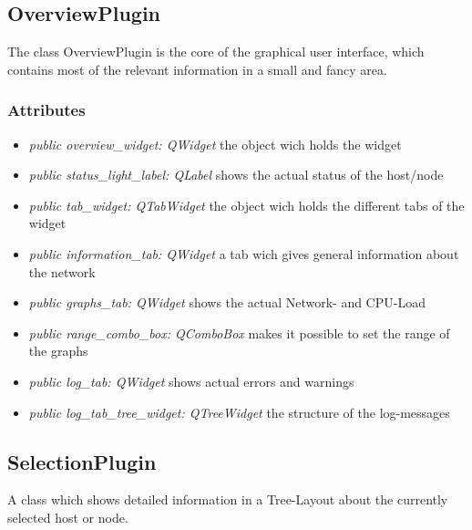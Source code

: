 \subsection{OverviewPlugin}
The class OverviewPlugin is the core of the graphical user interface, which
contains most of the relevant information in a small and fancy area.
\subsubsection{Attributes}
\begin{itemize}
  \item \textit{public overview\_widget: QWidget}
  the object wich holds the widget
  \item \textit{public status\_light\_label: QLabel}
  shows the actual status of the host/node
  \item \textit{public tab\_widget: QTabWidget}
  the object wich holds the different tabs of the widget
  \item \textit{public information\_tab: QWidget}
  a tab wich gives general information about the network 
  \item \textit{public graphs\_tab: QWidget}
  shows the actual Network- and CPU-Load
  \item \textit{public range\_combo\_box: QComboBox}
  makes it possible to set the range of the graphs
  \item \textit{public log\_tab: QWidget}
  shows actual errors and warnings
  \item \textit{public log\_tab\_tree\_widget: QTreeWidget}
  the structure of the log-messages  
\end{itemize}

\subsection{SelectionPlugin}
A class which shows detailed information in a Tree-Layout about the currently
selected host or node.
